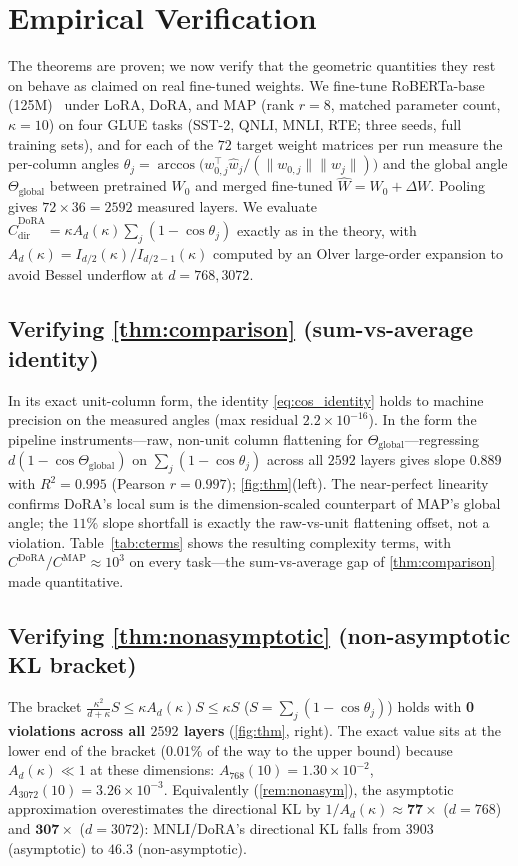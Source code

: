 \documentclass[11pt]{article}
\newcommand{\Ad}{A_d}
\newcommand{\Thetaglob}{\Theta_{\mathrm{global}}}
\begin{document}
\section{Empirical Verification}
\label{sec:experiments}
The theorems are proven; we now verify that the geometric quantities they rest on
behave as claimed on real fine-tuned weights. We fine-tune RoBERTa-base
(125M)~\cite{liu2019roberta} under LoRA, DoRA, and MAP (rank $r{=}8$, matched
parameter count, $\kappa{=}10$) on four GLUE tasks (SST-2, QNLI, MNLI, RTE; three
seeds, full training sets), and for each of the $72$ target weight matrices per run
measure the per-column angles $\theta_j=\arccos\!\big(w_{0,j}^\top\hat w_j/(\|w_{0,j}\|\|\hat w_j\|)\big)$
and the global angle $\Thetaglob$ between pretrained $W_0$ and merged fine-tuned
$\hat W=W_0+\Delta W$. Pooling gives $72\times36=2592$ measured layers. We evaluate
$\widehat C^{\mathrm{DoRA}}_{\mathrm{dir}}=\kappa \Ad(\kappa)\sum_j(1-\cos\theta_j)$ exactly as
in the theory, with $\Ad(\kappa)=I_{d/2}(\kappa)/I_{d/2-1}(\kappa)$ computed by an Olver
large-order expansion to avoid Bessel underflow at $d=768,3072$.

\subsection{Verifying \cref{thm:comparison} (sum-vs-average identity)}
In its exact unit-column form, the identity \eqref{eq:cos_identity} holds to machine
precision on the measured angles (max residual $2.2\times10^{-16}$). In the form the
pipeline instruments---raw, non-unit column flattening for $\Thetaglob$---regressing
$d(1-\cos\Thetaglob)$ on $\sum_j(1-\cos\theta_j)$ across all $2592$ layers gives slope
$0.889$ with $R^2=0.995$ (Pearson $r=0.997$); \cref{fig:thm}(left). The near-perfect
linearity confirms DoRA's local sum is the dimension-scaled counterpart of MAP's
global angle; the $11\%$ slope shortfall is exactly the raw-vs-unit flattening offset,
not a violation. Table~\ref{tab:cterms} shows the resulting complexity terms, with
$C^{\mathrm{DoRA}}/C^{\mathrm{MAP}}\approx10^3$ on every task---the sum-vs-average gap of
\cref{thm:comparison} made quantitative.

\subsection{Verifying \cref{thm:nonasymptotic} (non-asymptotic KL bracket)}
The bracket $\frac{\kappa^2}{d+\kappa}S\le\kappa \Ad(\kappa)S\le\kappa S$
($S=\sum_j(1-\cos\theta_j)$) holds with \textbf{0 violations across all $2592$
layers} (\cref{fig:thm}, right). The exact value sits at the lower end of the bracket
($0.01\%$ of the way to the upper bound) because $\Ad(\kappa)\ll1$ at these
dimensions: $A_{768}(10)=1.30\times10^{-2}$, $A_{3072}(10)=3.26\times10^{-3}$.
Equivalently (\cref{rem:nonasym}), the asymptotic approximation overestimates the
directional KL by $1/\Ad(\kappa)\approx\mathbf{77\times}$ ($d{=}768$) and
$\mathbf{307\times}$ ($d{=}3072$): MNLI/DoRA's directional KL falls from $3903$
(asymptotic) to $46.3$ (non-asymptotic).
\end{document}
